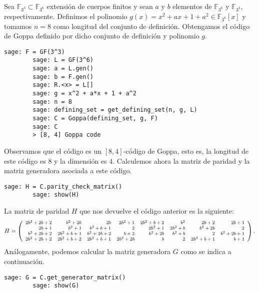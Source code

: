 \begin{exampleth}
    \label{ex:goppa-3_3}
    Sea $\mathbb{F}_{3^3} \subset \mathbb{F}_{3^6}$ extensión de cuerpos finitos y sean $a$ y $b$ elementos de $\mathbb{F}_{3^6}$ y $\mathbb{F}_{3^3}$, respectivamente. Definimos el polinomio $g(x) = x^2 + ax + 1 + a^2 \in \mathbb{F}_{3^6}[x]$ y tomamos $n = 8$ como longitud del conjunto de definición. Obtengamos el código de Goppa definido por dicho conjunto de definición y polinomio $g$.

    \begin{lstlisting}[gobble=4]
        sage: F = GF(3^3)
        sage: L = GF(3^6)
        sage: a = L.gen()
        sage: b = F.gen()
        sage: R.<x> = L[]
        sage: g = x^2 + a*x + 1 + a^2
        sage: n = 8
        sage: defining_set = get_defining_set(n, g, L)
        sage: C = Goppa(defining_set, g, F)
        sage: C
        > [8, 4] Goppa code
    \end{lstlisting}
    
    Observamos que el código es un $[8, 4]$-código de Goppa, esto es, la longitud de este código es $8$ y la dimensión es $4$. Calculemos ahora la matriz de paridad y la matriz generadora asociada a este código.

    \begin{lstlisting}[gobble=4]
        sage: H = C.parity_check_matrix()
        sage: show(H)
    \end{lstlisting}

    La matriz de paridad $H$ que nos devuelve el código anterior es la siguiente:
    \[
        \footnotesize
        H = 
        \left(\begin{array}{rrrrrrrr}
        2 b^{2} + 2 b + 2 & b^{2} + 2 b & 2 b & 2 b^{2} + 1 & 2 b^{2} + b + 2 & b^{2} & 2 b + 2 & 2 b + 1 \\
        2 b + 1 & b^{2} + 1 & b^{2} + b + 1 & 2 & 2 b^{2} + 1 & 2 b^{2} + b & b^{2} + 2 b & 2 \\
        b^{2} + 2 b + 2 & 2 b^{2} + b + 1 & b^{2} + 2 b + 2 & b + 2 & b^{2} + 2 b & b^{2} + b & 2 & b^{2} + 2 b + 1 \\
        2 b^{2} + 2 b + 2 & 2 b^{2} + b + 2 & 2 b^{2} + b + 1 & 2 b^{2} + 2 b & b & 2 & 2 b^{2} + b + 1 & b + 1
        \end{array}\right).
    \]
    Análogamente, podemos calcular la matriz generadora $G$ como se indica a continuación.

    \begin{lstlisting}[gobble=4]
        sage: G = C.get_generator_matrix()
        sage: show(G)
    \end{lstlisting}


\end{exampleth}
